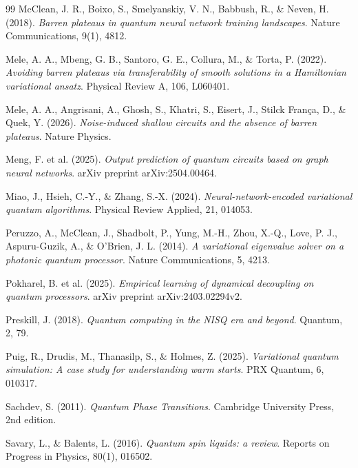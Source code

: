 \documentclass[11pt,a4paper,spanish]{book}
\begin{document}
\begin{thebibliography}{99}
 McClean, J. R., Boixo, S., Smelyanskiy, V. N., Babbush, R., \& Neven, H. (2018). \emph{Barren plateaus in quantum neural network training landscapes}. Nature Communications, 9(1), 4812.

 Mele, A. A., Mbeng, G. B., Santoro, G. E., Collura, M., \& Torta, P. (2022). \emph{Avoiding barren plateaus via transferability of smooth solutions in a Hamiltonian variational ansatz}. Physical Review A, 106, L060401.

 Mele, A. A., Angrisani, A., Ghosh, S., Khatri, S., Eisert, J., Stilck Fran\c{c}a, D., \& Quek, Y. (2026). \emph{Noise-induced shallow circuits and the absence of barren plateaus}. Nature Physics.

 Meng, F. et al. (2025). \emph{Output prediction of quantum circuits based on graph neural networks}. arXiv preprint arXiv:2504.00464.

 Miao, J., Hsieh, C.-Y., \& Zhang, S.-X. (2024). \emph{Neural-network-encoded variational quantum algorithms}. Physical Review Applied, 21, 014053.

 Peruzzo, A., McClean, J., Shadbolt, P., Yung, M.-H., Zhou, X.-Q., Love, P. J., Aspuru-Guzik, A., \& O'Brien, J. L. (2014). \emph{A variational eigenvalue solver on a photonic quantum processor}. Nature Communications, 5, 4213.

 Pokharel, B. et al. (2025). \emph{Empirical learning of dynamical decoupling on quantum processors}. arXiv preprint arXiv:2403.02294v2.

 Preskill, J. (2018). \emph{Quantum computing in the NISQ era and beyond}. Quantum, 2, 79.

 Puig, R., Drudis, M., Thanasilp, S., \& Holmes, Z. (2025). \emph{Variational quantum simulation: A case study for understanding warm starts}. PRX Quantum, 6, 010317.

 Sachdev, S. (2011). \emph{Quantum Phase Transitions}. Cambridge University Press, 2nd edition.

 Savary, L., \& Balents, L. (2016). \emph{Quantum spin liquids: a review}. Reports on Progress in Physics, 80(1), 016502.


\end{thebibliography}
\end{document}
